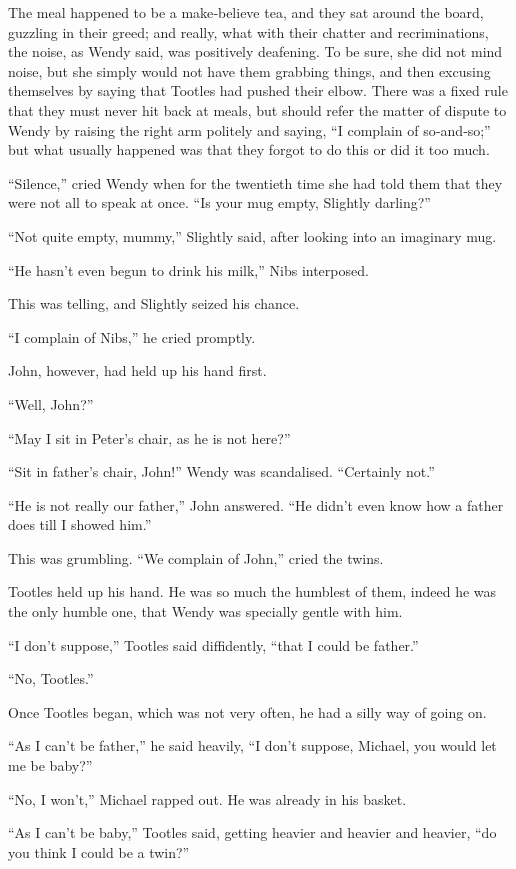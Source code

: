 The meal happened to be a make‐believe tea,
and they sat around the board, guzzling in their greed;
and really, what with their chatter and recriminations,
the noise, as Wendy said, was positively deafening.
To be sure, she did not mind noise,
but she simply would not have them grabbing things,
and then excusing themselves by saying that Tootles had pushed their elbow.
There was a fixed rule that they must never hit back at meals,
but should refer the matter of dispute to Wendy by raising the right arm politely and saying,
“I complain of so‐and‐so;”
but what usually happened was that they forgot to do this or did it too much.

“Silence,” cried Wendy when for the twentieth time she had told them that they were not all to speak at once.
“Is your mug empty, Slightly darling?”

“Not quite empty, mummy,” Slightly said, after looking into an imaginary mug.

“He hasn’t even begun to drink his milk,” Nibs interposed.

This was telling, and Slightly seized his chance.

“I complain of Nibs,” he cried promptly.

John, however, had held up his hand first.

“Well, John?”

“May I sit in Peter’s chair, as he is not here?”

“Sit in father’s chair, John!”
Wendy was scandalised.
“Certainly not.”

“He is not really our father,” John answered.
“He didn’t even know how a father does till I showed him.”

This was grumbling.
“We complain of John,” cried the twins.

Tootles held up his hand.
He was so much the humblest of them,
indeed he was the only humble one, that Wendy was specially gentle with him.

“I don’t suppose,” Tootles said diffidently,
“that I could be father.”

“No, Tootles.”

Once Tootles began, which was not very often, he had a silly way of going on.

“As I can’t be father,” he said heavily,
“I don’t suppose, Michael, you would let me be baby?”

“No, I won’t,” Michael rapped out.
He was already in his basket.

“As I can’t be baby,” Tootles said, getting heavier and heavier and heavier,
“do you think I could be a twin?”

